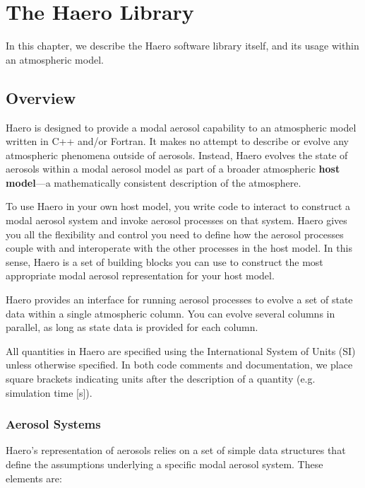 \chapter{The Haero Library}

In this chapter, we describe the Haero software library itself, and its usage
within an atmospheric model.

\section{Overview}

Haero is designed to provide a modal aerosol capability to an atmospheric model
written in C++ and/or Fortran. It makes no attempt to describe or evolve any
atmospheric phenomena outside of aerosols. Instead, Haero evolves the state of
aerosols within a modal aerosol model as part of a broader atmospheric
{\bf host model}---a mathematically consistent description of the atmosphere.

To use Haero in your own host model, you write code to interact to construct
a modal aerosol system and invoke aerosol processes on that system. Haero gives
you all the flexibility and control you need to define how the aerosol processes
couple with and interoperate with the other processes in the host model. In this
sense, Haero is a set of building blocks you can use to construct the most
appropriate modal aerosol representation for your host model.

Haero provides an interface for running aerosol processes to evolve a set of
state data within a single atmospheric column. You can evolve several columns
in parallel, as long as state data is provided for each column.

All quantities in Haero are specified using the International System of Units
(SI) unless otherwise specified. In both code comments and documentation, we
place square brackets indicating units after the description of a quantity
(e.g. simulation time [s]).

\subsection{Aerosol Systems}

Haero's representation of aerosols relies on a set of simple data structures
that define the assumptions underlying a specific modal aerosol system. These
elements are:

